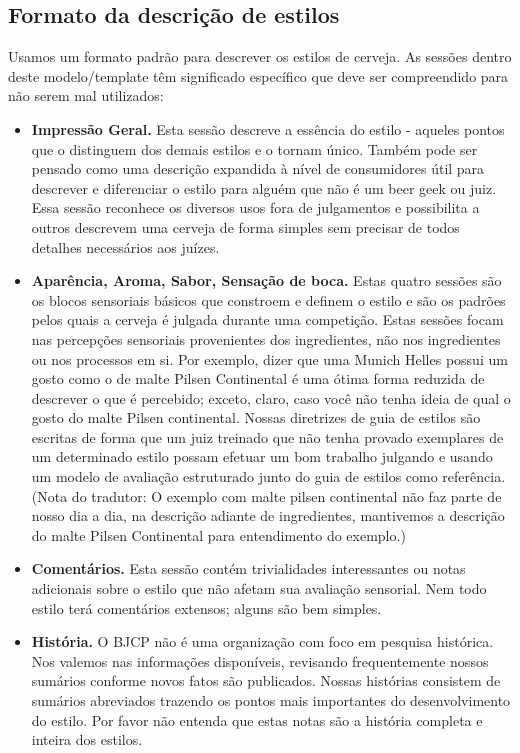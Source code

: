 \subsection*{Formato da descrição de estilos}

Usamos um formato padrão para descrever os estilos de cerveja. As sessões dentro deste modelo/template têm significado específico que deve ser compreendido para não serem mal utilizados:
\begin{itemize}
\item \textbf{Impressão Geral.} Esta sessão descreve a essência do estilo - aqueles pontos que o distinguem dos demais estilos e o tornam único. Também pode ser pensado como uma descrição expandida à nível de consumidores útil para descrever e diferenciar o estilo para alguém que não é um beer geek ou juiz. Essa sessão reconhece os diversos usos fora de julgamentos e possibilita a outros descrevem uma cerveja de forma simples sem precisar de todos detalhes necessários aos juízes.
\item \textbf{Aparência, Aroma, Sabor, Sensação de boca.} Estas quatro sessões são os blocos sensoriais básicos que constroem e definem o estilo e são os padrões pelos quais a cerveja é julgada durante uma competição. Estas sessões focam nas percepções sensoriais provenientes dos ingredientes, não nos ingredientes ou nos processos em si. Por exemplo, dizer que uma Munich Helles possui um gosto como o de malte Pilsen Continental é uma ótima forma reduzida de descrever o que é percebido; exceto, claro, caso você não tenha ideia de qual o gosto do malte Pilsen continental. Nossas diretrizes de guia de estilos são escritas de forma que um juiz treinado que não tenha provado exemplares de um determinado estilo possam efetuar um bom trabalho julgando e usando um modelo de avaliação estruturado junto do guia de estilos como referência.\\ (Nota do tradutor: O exemplo com malte pilsen continental não faz parte de nosso dia a dia, na descrição adiante de ingredientes, mantivemos a descrição do malte Pilsen Continental para entendimento do exemplo.)
\item \textbf{Comentários.} Esta sessão contém trivialidades interessantes ou notas adicionais sobre o estilo que não afetam sua avaliação sensorial. Nem todo estilo terá comentários extensos; alguns são bem simples.
\item \textbf{História.} O BJCP não é uma organização com foco em pesquisa histórica. Nos valemos nas informações disponíveis, revisando frequentemente nossos sumários conforme novos fatos são publicados. Nossas histórias consistem de sumários abreviados trazendo os pontos mais importantes do desenvolvimento do estilo. Por favor não entenda que estas notas são a história completa e inteira dos estilos.

\end{itemize}
